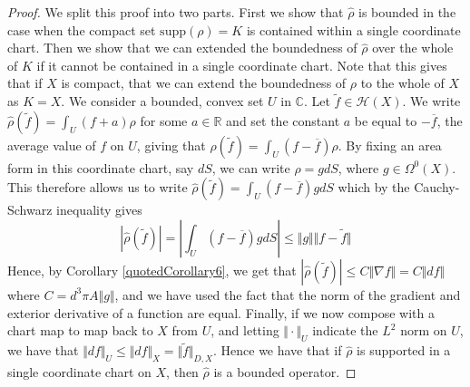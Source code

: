 \documentclass[11pt]{report}
\theoremstyle{definition}
\begin{document}
\begin{proof}
  We split this proof into two parts. First we show that $\hat{\rho}$ is bounded in the case when the compact set $\text{supp}(\rho) = K$ is contained within a single coordinate chart. Then we show that we can extended the boundedness of $\hat{\rho}$ over the whole of $K$ if it cannot be contained in a single coordinate chart. Note that this gives that if $X$ is compact, that we can extend the boundedness of $\rho$ to the whole of $X$ as $K=X$. We consider a bounded, convex set $U$ in $\mathbb{C}$. Let $\tilde{f} \in \mathcal{H}(X)$. We write $\hat{\rho}(\tilde{f}) = \int_U (f + a) \rho$ for some $a \in \mathbb{R}$ and set the constant $a$ be equal to $-\overline{f}$, the average value of $f$ on $U$, giving that  $\hat{\rho}(\tilde{f}) = \int_U (f - \overline{f}) \rho$. By fixing an area form in this coordinate chart, say $dS$, we can write $\rho = g dS$, where $g \in \Omega^0(X)$. This therefore allows us to write $\hat{\rho}(\tilde{f}) = \int_U (f - \overline{f}) g dS$ which by the Cauchy-Schwarz inequality gives
  \[ |\hat{\rho}(\tilde{f})| = \left| \int_U (f - \overline{f}) g dS \right| \leq \Vert g \Vert \Vert f-\tilde{f} \Vert  \]
  Hence, by Corollary \ref{quotedCorollary6}, we get that $|\hat{\rho}(\tilde{f})| \leq C \Vert \nabla f \Vert = C \Vert df \Vert$ where $C = d^3\pi A \Vert g \Vert$, and we have used the fact that the norm of the gradient and exterior derivative of a function are equal.
  Finally, if we now compose with a chart map to map back to $X$ from $U$, and letting $ \Vert \cdot \Vert_U$ indicate the $L^2$ norm on $U$, we have that $ \Vert df \Vert_U \leq \Vert df \Vert_X = \Vert \tilde{f} \Vert_{D,X}$. Hence we have that if $\hat{\rho}$ is supported in a single coordinate chart on $X$, then $\hat{\rho}$ is a bounded operator.


\end{proof}
\end{document}

